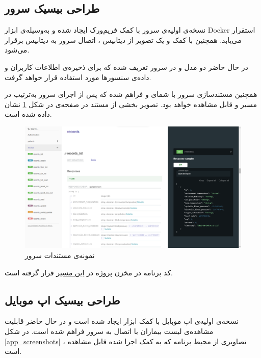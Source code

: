 \documentclass[12pt]{article}
\begin{document}
\newpage

\subsection{طراحی بیسیک سرور}
نسخه‌ی اولیه‌ی سرور با کمک فریم‌ورک  ایجاد شده و به‌وسیله‌ی ابزار Docker استقرار می‌یابد. همچنین با کمک  و یک تصویر از دیتابیس ، اتصال سرور به دیتابیس برقرار می‌شود. 

در حال حاضر دو مدل  و  در سرور تعریف شده که برای ذخیره‌ی اطلاعات کاربران و داده‌ی سنسورها مورد استفاده قرار خواهد گرفت.

همچنین مستندسازی  سرور با شمای  و  فراهم شده که پس از اجرای سرور به‌ترتیب در مسیر  و  قابل مشاهده خواهد بود. تصویر بخشی از مستند در صفحه‌ی  در شکل \ref{redoc} نشان داده شده است.

\begin{figure}[h]
	\begin{center}
		\includegraphics[width=\textwidth]{redoc}
	\end{center}
	\caption{نمونه‌ی مستندات  سرور}
	\label{redoc}
\end{figure}

کد برنامه در مخزن پروژه در 
\href{https://github.com/Sharif-University-ESRLab/project-team-2/tree/main/Code/backend}{این مسیر}
قرار گرفته است.

\newpage

\subsection{طراحی بیسیک اپ موبایل}
نسخه‌ی اولیه‌ی اپ موبایل با کمک ابزار  ایجاد شده است و در حال حاضر قابلیت مشاهده‌ی لیست بیماران با اتصال به سرور فراهم شده است.
در شکل
 \ref{app_screenshots}
، تصاویری از محیط برنامه که به کمک  اجرا شده قابل مشاهده است.
\end{document}
